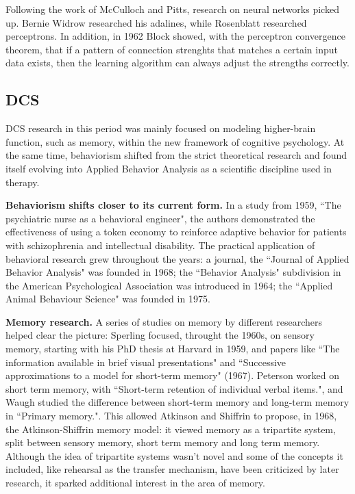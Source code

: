 \documentclass[../main.tex]{subfiles}
\begin{document}
Following the work of McCulloch and Pitts, research on neural networks picked up. Bernie Widrow researched his adalines\cite{widrowAssociativeStorageRetrieval1962}, while Rosenblatt researched perceptrons. In addition, in 1962 Block showed, with the perceptron convergence theorem, that if a pattern of connection strenghts that matches a certain input data exists, then the learning algorithm can always adjust the strengths correctly\cite{russellArtificialIntelligenceModern2002}.

\subsection{DCS}
DCS research in this period was mainly focused on modeling higher-brain function, such as memory, within the new framework of cognitive psychology. At the same time, behaviorism shifted from the strict theoretical research and found itself evolving into Applied Behavior Analysis as a scientific discipline used in therapy.

\vspace{4pt}
\textbf{Behaviorism shifts closer to its current form.}
In a study from 1959, ``The psychiatric nurse as a behavioral engineer"\cite{ayllonPsychiatricNurseBehavioral1959}, the authors demonstrated the effectiveness of using a token economy to reinforce adaptive behavior for patients with schizophrenia and intellectual disability. The practical application of behavioral research grew throughout the years: a journal, the ``Journal of Applied Behavior Analysis" was founded in 1968; the ``Behavior Analysis" subdivision in the American Psychological Association was introduced in 1964; the ``Applied Animal Behaviour Science" was founded in 1975.

\vspace{4pt}
\textbf{Memory research.}
A series of studies on memory by different researchers helped clear the picture: Sperling focused, throught the 1960s, on sensory memory, starting with his PhD thesis at Harvard in 1959, and papers like ``The information available in brief visual presentations"\cite{sperlingInformationAvailableBrief1960} and ``Successive approximations to a model for short-term memory" (1967). Peterson worked on short term memory, with ``Short-term retention of individual verbal items."\cite{petersonShorttermRetentionIndividual1959}, and Waugh studied the difference between short-term memory and long-term memory in ``Primary memory."\cite{waughPrimaryMemory1965}. This allowed Atkinson and Shiffrin to propose, in 1968, the Atkinson-Shiffrin memory model: it viewed memory as a tripartite system, split between sensory memory, short term memory and long term memory. Although the idea of tripartite systems wasn't novel \cite{jamesPrinciplesPsychology1890} and some of the concepts it included, like rehearsal as the transfer mechanism, have been criticized by later research, it sparked additional interest in the area of memory.
\end{document}
